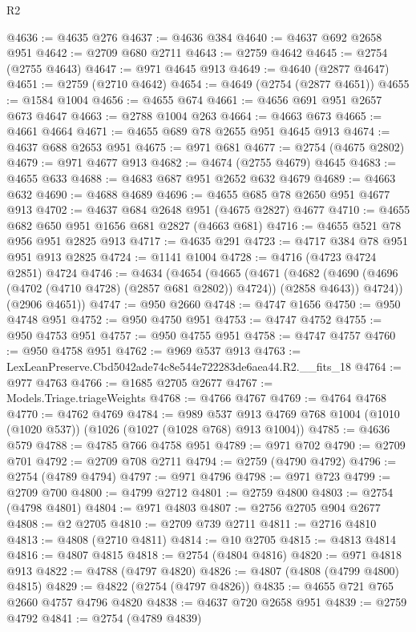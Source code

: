\begin{lexlean}{R2}
\begin{coremodule}
@4636 := @4635 @276
@4637 := @4636 @384
@4640 := @4637 @692 @2658 @951
@4642 := @2709 @680 @2711
@4643 := @2759 @4642
@4645 := @2754 (@2755 @4643)
@4647 := @971 @4645 @913
@4649 := @4640 (@2877 @4647)
@4651 := @2759 (@2710 @4642)
@4654 := @4649 (@2754 (@2877 @4651))
@4655 := @1584 @1004
@4656 := @4655 @674
@4661 := @4656 @691 @951 @2657 @673 @4647
@4663 := @2788 @1004 @263
@4664 := @4663 @673
@4665 := @4661 @4664
@4671 := @4655 @689 @78 @2655 @951 @4645 @913
@4674 := @4637 @688 @2653 @951
@4675 := @971 @681
@4677 := @2754 (@4675 @2802)
@4679 := @971 @4677 @913
@4682 := @4674 (@2755 @4679) @4645
@4683 := @4655 @633
@4688 := @4683 @687 @951 @2652 @632 @4679
@4689 := @4663 @632
@4690 := @4688 @4689
@4696 := @4655 @685 @78 @2650 @951 @4677 @913
@4702 := @4637 @684 @2648 @951 (@4675 @2827) @4677
@4710 := @4655 @682 @650 @951 @1656 @681 @2827 (@4663 @681)
@4716 := @4655 @521 @78 @956 @951 @2825 @913
@4717 := @4635 @291
@4723 := @4717 @384 @78 @951 @951 @913 @2825
@4724 := @1141 @1004
@4728 := @4716 (@4723 @4724 @2851) @4724
@4746 := @4634
    (@4654
      (@4665
        (@4671
          (@4682 (@4690 (@4696 (@4702 (@4710 @4728) (@2857 @681 @2802)) @4724)) (@2858 @4643))
          @4724))
      (@2906 @4651))
@4747 := @950 @2660
@4748 := @4747 @1656
@4750 := @950 @4748 @951
@4752 := @950 @4750 @951
@4753 := @4747 @4752
@4755 := @950 @4753 @951
@4757 := @950 @4755 @951
@4758 := @4747 @4757
@4760 := @950 @4758 @951
@4762 := @969 @537 @913
@4763 := LexLeanPreserve.Cbd5042ade74c8e544e722283de6aea44.R2.__fits_18
@4764 := @977 @4763
@4766 := @1685 @2705 @2677
@4767 := Models.Triage.triageWeights
@4768 := @4766 @4767
@4769 := @4764 @4768
@4770 := @4762 @4769
@4784 := @989
    @537
    @913
    @4769
    @768
    @1004
    (@1010 (@1020 @537))
    (@1026 (@1027 (@1028 @768) @913 @1004))
@4785 := @4636 @579
@4788 := @4785 @766 @4758 @951
@4789 := @971 @702
@4790 := @2709 @701
@4792 := @2709 @708 @2711
@4794 := @2759 (@4790 @4792)
@4796 := @2754 (@4789 @4794)
@4797 := @971 @4796
@4798 := @971 @723
@4799 := @2709 @700
@4800 := @4799 @2712
@4801 := @2759 @4800
@4803 := @2754 (@4798 @4801)
@4804 := @971 @4803
@4807 := @2756 @2705 @904 @2677
@4808 := @2 @2705
@4810 := @2709 @739 @2711
@4811 := @2716 @4810
@4813 := @4808 (@2710 @4811)
@4814 := @10 @2705
@4815 := @4813 @4814
@4816 := @4807 @4815
@4818 := @2754 (@4804 @4816)
@4820 := @971 @4818 @913
@4822 := @4788 (@4797 @4820)
@4826 := @4807 (@4808 (@4799 @4800) @4815)
@4829 := @4822 (@2754 (@4797 @4826))
@4835 := @4655 @721 @765 @2660 @4757 @4796 @4820
@4838 := @4637 @720 @2658 @951
@4839 := @2759 @4792
@4841 := @2754 (@4789 @4839)

\end{coremodule}
\end{lexlean}
